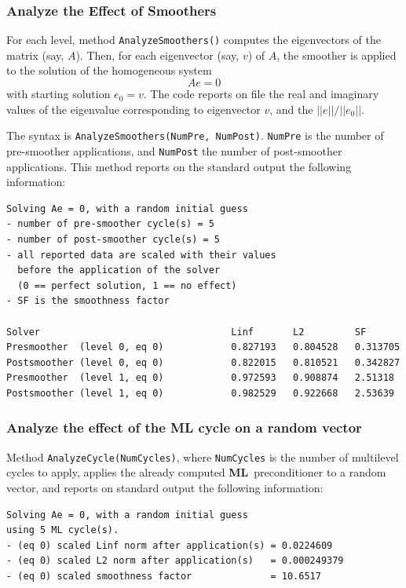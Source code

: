 \documentclass{article}[11pt]
\newcommand{\ML}     {{\bf ML}}
\begin{document}

\subsubsection{Analyze the Effect of Smoothers}

For each level, method \verb!AnalyzeSmoothers()! computes the eigenvectors of the matrix (say, $A$). 
Then, for each eigenvector (say, $v$) of $A$, the smoother is applied to the solution of the homogeneous system
\[
A e = 0
\]
with starting solution $e_0 = v$. The code reports on file the real and
imaginary values of the eigenvalue corresponding to eigenvector $v$, and the
$||e|| / ||e_0||$. 

The syntax is \verb!AnalyzeSmoothers(NumPre, NumPost)!. \verb!NumPre! is the number of pre-smoother applications, and
\verb!NumPost! the number of post-smoother applications.  
This method reports on the standard output the following information:
\begin{verbatim}
Solving Ae = 0, with a random initial guess
- number of pre-smoother cycle(s) = 5
- number of post-smoother cycle(s) = 5
- all reported data are scaled with their values
  before the application of the solver
  (0 == perfect solution, 1 == no effect)
- SF is the smoothness factor

Solver                                  Linf       L2         SF
Presmoother  (level 0, eq 0)            0.827193   0.804528   0.313705
Postsmoother (level 0, eq 0)            0.822015   0.810521   0.342827
Presmoother  (level 1, eq 0)            0.972593   0.908874   2.51318
Postsmoother (level 1, eq 0)            0.982529   0.922668   2.53639
\end{verbatim}


\subsubsection{Analyze the effect of the ML cycle on a random vector} 

Method \verb!AnalyzeCycle(NumCycles)!, where \verb!NumCycles! is the number of
multilevel cycles to apply, applies the already computed \ML~preconditioner to
a random vector, and reports on standard output the following information:
\begin{verbatim}
Solving Ae = 0, with a random initial guess
using 5 ML cycle(s).
- (eq 0) scaled Linf norm after application(s) = 0.0224609
- (eq 0) scaled L2 norm after application(s)   = 0.000249379
- (eq 0) scaled smoothness factor              = 10.6517
\end{verbatim}
\end{document}

